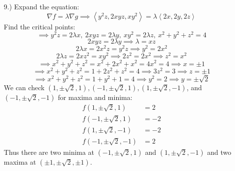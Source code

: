 \documentclass[12pt]{article}
\newcommand{\angleb}[1]{\left\langle#1\right\rangle}
\begin{document}
\begin{itemize}
    \item[9.)] Expand the equation:
    \[\nabla f=\lambda\nabla g\implies\angleb{y^2z,2xyz,xy^2}=\lambda\angleb{2x,2y,2z}\]
    Find the critical points:
    \[\implies y^2z=2\lambda x,\ 2xyz=2\lambda y,\ xy^2=2\lambda z,\ x^2+y^2+z^2=4\]
    \[2xyz=2\lambda y\implies\lambda=xz\]
    \[2\lambda x=2x^2z=y^2z\implies y^2=2x^2\]
    \[2\lambda z=2xz^2=xy^2\implies 2z^2=2x^2\implies z^2=x^2\]
    \[\implies x^2+y^2+z^2=x^2+2x^2+x^2=4x^2=4\implies x=\pm1\]
    \[\implies x^2+y^2+z^2=1+2z^2+z^2=4\implies 3z^2=3\implies z=\pm1\]
    \[\implies x^2+y^2+z^2=1+y^2+1=4\implies y^2=2\implies y=\pm\sqrt{2}\]
    We can check $(1,\pm\sqrt2,1),(-1,\pm\sqrt2,1),(1,\pm\sqrt2,-1)$, and $(-1,\pm\sqrt2,-1)$ for maxima and minima:
    \begin{align*}
        f(1,\pm\sqrt2,1)&=2\\
        f(-1,\pm\sqrt2,1)&=-2\\
        f(1,\pm\sqrt2,-1)&=-2\\
        f(-1,\pm\sqrt2,-1)&=2
    \end{align*}
    Thus there are two minima at $(-1,\pm\sqrt2,1)$ and $(1,\pm\sqrt2,-1)$ and two maxima at $(\pm1,\pm\sqrt2,\pm1)$.

\end{itemize}
\end{document}

